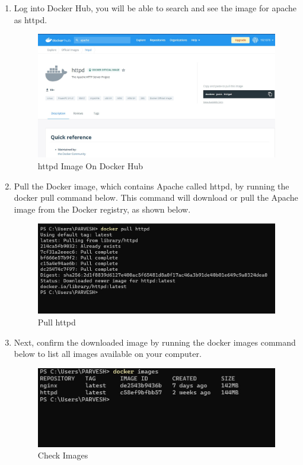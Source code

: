 \documentclass[12pt]{article}
\begin{document}
\begin{enumerate}
\item Log into Docker Hub, you will be able to search and see the image for apache as httpd.

\begin{figure}[H]
\centering
\includegraphics[scale=0.5]{fig21}
\caption{httpd Image On Docker Hub}
\vspace{0.6\baselineskip}
\end{figure}


\item Pull the Docker image, which contains Apache called httpd, by running the docker pull command below. This command will download or pull the Apache image from the Docker registry, as shown below.

\begin{figure}[H]
\centering
\includegraphics[scale=0.6]{fig22}
\caption{Pull httpd}
\vspace{0.6\baselineskip}
\end{figure}	

\item Next, confirm the downloaded image by running the docker images command below to list all images available on your computer.

\begin{figure}[H]
\centering
\includegraphics[scale=0.7]{fig23}
\caption{Check Images}
\vspace{0.6\baselineskip}
\end{figure}	


\end{enumerate}
\end{document}
